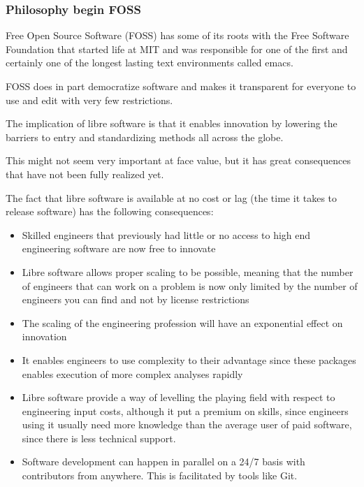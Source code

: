 \documentclass{beamer}
\begin{document}
\begin{frame}
\frametitle{Philosophy begin FOSS}

Free Open Source Software (FOSS) has some of its roots with the Free Software Foundation that started life at MIT and was responsible for one of the first and certainly one of the longest lasting text environments called emacs.

FOSS does in part democratize software and makes it transparent for everyone to use and edit with very few restrictions.

The implication of libre software is that it enables innovation by lowering the barriers to entry and standardizing methods all across the globe.

This might not seem very important at face value, but it has great consequences that have not been fully realized yet.

The fact that libre software is available at no cost or lag (the time it takes to release software) has the following consequences:

\begin{itemize}
\item Skilled engineers that previously had little or no access to high end engineering software are now free to innovate
\item Libre software allows proper scaling to be possible, meaning that the number of engineers that can work on a problem is now only limited by the number of engineers you can find and not by license restrictions
\item The scaling of the engineering profession will have an exponential effect on innovation
\item It enables engineers to use complexity to their advantage since these packages enables execution of more complex analyses rapidly
\item Libre software provide a way of levelling the playing field with respect to engineering input costs, although it put a premium on skills, since engineers using it usually need more knowledge than the average user of paid software, since there is less technical support.
\item Software development can happen in parallel on a 24/7 basis with contributors from anywhere.  This is facilitated by tools like Git.
\end{itemize}

\end{frame}

\end{document}

